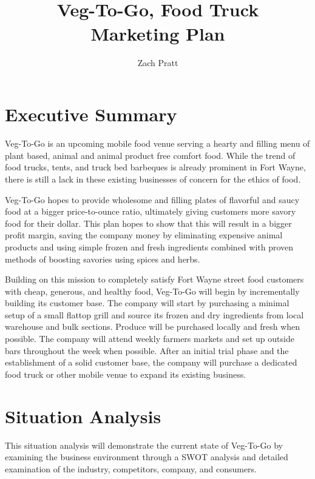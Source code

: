 \documentclass[12pt, letterpaper]{article}
\newcommand{\companyname}{Veg-To-Go}
\begin{document}
\title{\companyname{},\textsuperscript{\textregistered} Food Truck\\ Marketing Plan}
\author{Zach Pratt}
\maketitle

\newpage

\renewcommand\contentsname{Table of Contents}
\renewcommand{\cftsecleader}{\cftdotfill{\cftdotsep}}
\tableofcontents

\newpage

\section{Executive Summary}
Veg-To-Go is an upcoming mobile food venue serving a hearty and filling menu of plant based, animal and animal product free comfort food.  While the trend of food trucks, tents, and truck bed barbeques is already prominent in Fort Wayne, there is still a lack in these existing businesses of concern for the ethics of food.

Veg-To-Go hopes to provide wholesome and filling plates of flavorful and saucy food at a bigger price-to-ounce ratio, ultimately giving customers more savory food for their dollar.  This plan hopes to show that this will result in a bigger profit margin, saving the company money by eliminating expensive animal products and using simple frozen and fresh ingredients combined with proven methods of boosting savories using spices and herbs.

Building on this mission to completely satisfy Fort Wayne street food customers with cheap, generous, and healthy food, Veg-To-Go will begin by incrementally building its customer base.  The company will start by purchasing a minimal setup of a small flattop grill and source its frozen and dry ingredients from local warehouse and bulk sections. Produce will be purchased locally and fresh when possible.  The company will attend weekly farmers markets and set up outside bars throughout the week when possible.  After an initial trial phase and the establishment of a solid customer base, the company will purchase a dedicated food truck or other mobile venue to expand its existing business.

\section{Situation Analysis}
This situation analysis will demonstrate the current state of \companyname{} by examining the business environment through a SWOT analysis and detailed examination of the industry, competitors, company, and consumers.
\end{document}
